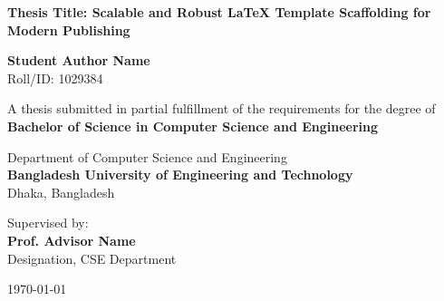 \begin{titlepage}
\begin{center}
    \vspace*{1cm}
    
    
    \vspace{1.5cm}
    
    {\huge \bfseries \color{primary} Thesis Title: Scalable and Robust LaTeX Template Scaffolding for Modern Publishing}
    
    \vspace{1.5cm}
    
    {\Large \bfseries Student Author Name} \\
    \vspace{0.2cm}
    {Roll/ID: 1029384}
    
    \vspace{1.5cm}
    
    {A thesis submitted in partial fulfillment of the requirements for the degree of} \\
    \vspace{0.3cm}
    {\large \bfseries \color{secondary} Bachelor of Science in Computer Science and Engineering}
    
    \vspace{1.5cm}
    
    {\large Department of Computer Science and Engineering} \\
    \vspace{0.2cm}
    {\large \bfseries \color{primary} Bangladesh University of Engineering and Technology} \\
    \vspace{0.1cm}
    {Dhaka, Bangladesh}
    
    \vfill
    
    {Supervised by:} \\
    {\large \bfseries Prof. Advisor Name} \\
    {Designation, CSE Department}
    
    \vspace{1cm}
    
    {\large \today}
    
\end{center}
\end{titlepage}

